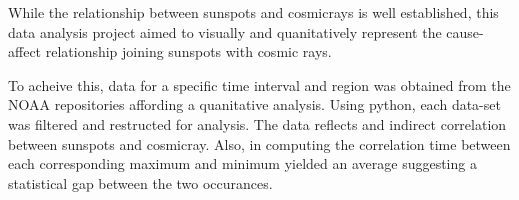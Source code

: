 \par While the relationship between sunspots and cosmicrays is well established,
this data analysis project aimed to visually
and quanitatively represent the cause-affect relationship joining sunspots with
cosmic rays.\\
\par To acheive this, data for a specific time interval and region was 
obtained from the NOAA repositories affording a quanitative analysis.\cite{raydata} \cite{spotdata}
Using python, each data-set was filtered and
restructed for analysis. The data reflects and indirect correlation between
sunspots and cosmicray. Also, in computing the correlation time between
each corresponding maximum and minimum yielded an average suggesting
a statistical gap between the two occurances.
